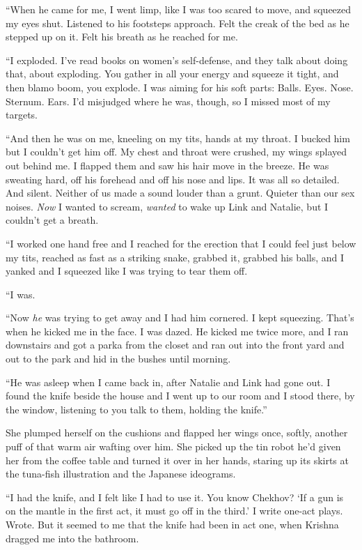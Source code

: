 \documentclass{article}
\begin{document}
``When he came for me, I went limp, like I was too scared to move, and
squeezed my eyes shut.  Listened to his footsteps approach.  Felt the
creak of the bed as he stepped up on it.  Felt his breath as he
reached for me.

``I exploded.  I've read books on women's self-defense, and they talk
about doing that, about exploding.  You gather in all your energy and
squeeze it tight, and then blamo boom, you explode.  I was aiming for
his soft parts:  Balls.  Eyes.  Nose.  Sternum.  Ears.  I'd misjudged
where he was, though, so I missed most of my targets.

``And then he was on me, kneeling on my tits, hands at my throat.  I
bucked him but I couldn't get him off.  My chest and throat were
crushed, my wings splayed out behind me.  I flapped them and saw his
hair move in the breeze.  He was sweating hard, off his forehead and
off his nose and lips.  It was all so detailed.  And silent.  Neither
of us made a sound louder than a grunt.  Quieter than our sex noises. 
\textit{Now} I wanted to scream, \textit{wanted} to wake up Link and
Natalie, but I couldn't get a breath.

``I worked one hand free and I reached for the erection that I could
feel just below my tits, reached as fast as a striking snake, grabbed
it, grabbed his balls, and I yanked and I squeezed like I was trying
to tear them off.

``I was.

``Now \textit{he} was trying to get away and I had him cornered.  I
kept squeezing.  That's when he kicked me in the face.  I was dazed. 
He kicked me twice more, and I ran downstairs and got a parka from the
closet and ran out into the front yard and out to the park and hid in
the bushes until morning.

``He was asleep when I came back in, after Natalie and Link had gone
out.  I found the knife beside the house and I went up to our room and
I stood there, by the window, listening to you talk to them, holding
the knife.''

She plumped herself on the cushions and flapped her wings once,
softly, another puff of that warm air wafting over him.  She picked up
the tin robot he'd given her from the coffee table and turned it over
in her hands, staring up its skirts at the tuna-fish illustration and
the Japanese ideograms.

``I had the knife, and I felt like I had to use it.  You know Chekhov? 
`If a gun is on the mantle in the first act, it must go off in the
third.' I write one-act plays.  Wrote.  But it seemed to me that the
knife had been in act one, when Krishna dragged me into the bathroom.
\end{document}
